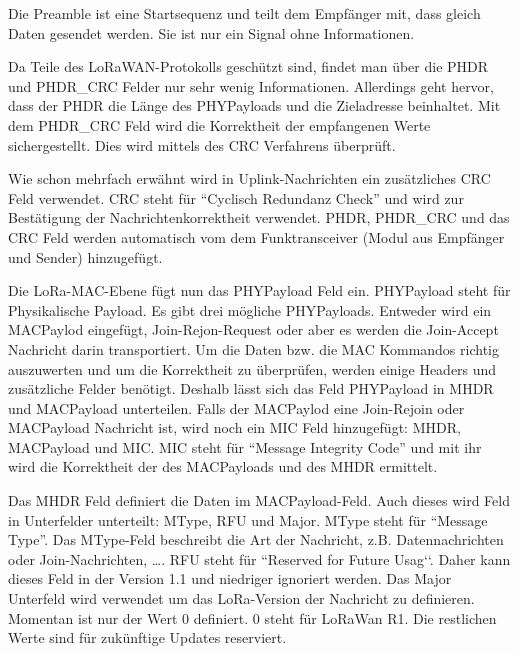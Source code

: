 \documentclass[a4paper, 12pt]{article}
\begin{document}
                Die Preamble ist eine Startsequenz und teilt dem Empfänger mit, dass gleich Daten gesendet werden. 
                Sie ist nur ein Signal ohne Informationen.

                Da Teile des LoRaWAN-Protokolls geschützt sind, findet man über die PHDR und PHDR\_CRC Felder nur sehr wenig 
                Informationen. Allerdings geht hervor, dass der PHDR die Länge des PHYPayloads und die Zieladresse 
                beinhaltet.
                Mit dem PHDR\_CRC Feld wird die Korrektheit der empfangenen Werte sichergestellt. Dies wird  
                mittels des CRC Verfahrens überprüft.
                
                Wie schon mehrfach erwähnt wird in Uplink-Nachrichten ein zusätzliches CRC Feld verwendet. CRC steht für 
                ``Cyclisch Redundanz Check'' und wird zur Bestätigung der Nachrichtenkorrektheit verwendet. 
                PHDR, PHDR\_CRC 
                und das CRC Feld werden automatisch vom dem Funktransceiver (Modul aus Empfänger und Sender) hinzugefügt.

                Die LoRa-MAC-Ebene fügt nun das PHYPayload Feld ein. PHYPayload steht für Physikalische Payload. 
                Es gibt drei mögliche PHYPayloads. Entweder wird ein MACPaylod eingefügt, Join-Rejon-Request oder aber 
                es werden die Join-Accept Nachricht darin transportiert. Um die Daten bzw. die MAC Kommandos richtig auszuwerten 
                und um die Korrektheit zu überprüfen, werden einige Headers und zusätzliche Felder benötigt. 
                Deshalb lässt sich das Feld PHYPayload in MHDR und MACPayload unterteilen. Falls der 
                MACPaylod eine Join-Rejoin oder MACPayload Nachricht ist, wird noch ein MIC 
                Feld hinzugefügt: MHDR, MACPayload und MIC. MIC steht für ``Message Integrity Code'' und mit ihr wird 
                die Korrektheit der des MACPayloads und des MHDR ermittelt.

                Das MHDR Feld definiert die Daten im MACPayload-Feld. Auch dieses wird Feld in 
                Unterfelder unterteilt: MType, RFU und Major. MType steht für ``Message Type''. Das MType-Feld beschreibt die Art der 
                Nachricht, z.B. Datennachrichten oder Join-Nachrichten, \dots. 
                RFU steht für ``Reserved for Future Usag‘‘. Daher kann 
                dieses Feld in der Version 1.1 und niedriger ignoriert werden. Das Major Unterfeld wird verwendet um das 
                LoRa-Version der Nachricht zu definieren. Momentan ist nur der Wert 0 definiert. 0 steht für LoRaWan R1. 
                Die restlichen Werte sind für zukünftige Updates reserviert.
\end{document}
